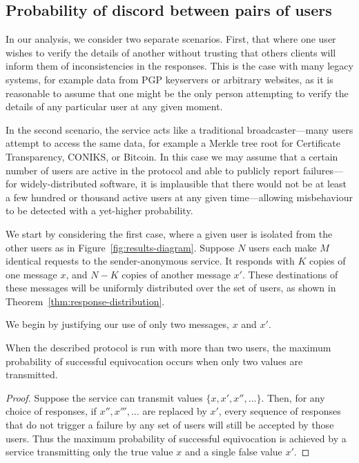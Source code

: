 \documentclass[USenglish]{llncs}
\begin{document}
\subsection{Probability of discord between pairs of users}
In our analysis, we consider two separate scenarios.  First, that where one user
wishes to verify the details of another without trusting that others clients will inform them
of inconsistencies in the responses.  This is the case with many legacy systems, for
example data from PGP keyservers or arbitrary websites, as it is reasonable to
assume that one might
be the only person attempting to verify the details of any particular user at any
given moment.

In the second scenario, the service acts like a traditional broadcaster---many users
attempt to access the same data, for example a Merkle tree root for
Certificate Transparency, CONIKS, or Bitcoin.  In this case we may assume that a certain
number of users are active in the protocol and able to publicly report failures---for
widely-distributed software, it is implausible that there would not be at least a few
hundred or thousand active users at any given time---allowing misbehaviour to be detected
with a yet-higher probability.

We start by considering the first case, where a given user is isolated from the
other users as in Figure~\ref{fig:results-diagram}.  Suppose $N$ users
each make $M$ identical requests to the sender-anonymous service.
It responds with $K$ copies of one message $x$, and $N-K$ copies
of another message $x'$.  These destinations of these
messages will be uniformly distributed over the set of users, as
shown in Theorem~\ref{thm:response-distribution}.

We begin by justifying our use of only two messages, $x$ and $x'$.

\begin{lemma}\label{lem:response-count}
When the described protocol is run with more than
two users, the maximum probability of successful equivocation occurs
when only two values are transmitted.

\begin{proof}
Suppose the service can transmit values $\{x, x', x'', \ldots\}$.  Then, for any choice of
responses, if $x'', x''', \ldots$ are replaced by $x'$, every sequence
of responses that do not trigger a failure by any set of users will still be accepted
by those users. Thus the maximum probability of successful equivocation is achieved
by a service transmitting only the true value $x$ and a single false value $x'$.
\end{proof}
\end{lemma}
\end{document}
